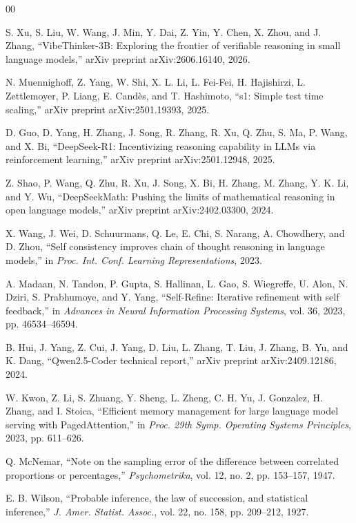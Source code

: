 \documentclass[conference]{IEEEtran}
\begin{document}
\begin{thebibliography}{00}

S. Xu, S. Liu, W. Wang, J. Min, Y. Dai, Z. Yin, Y. Chen, X. Zhou, and J. Zhang,
``VibeThinker-3B: Exploring the frontier of verifiable reasoning in small language
models,'' arXiv preprint arXiv:2606.16140, 2026.

N. Muennighoff, Z. Yang, W. Shi, X. L. Li, L. Fei-Fei, H. Hajishirzi,
L. Zettlemoyer, P. Liang, E. Cand\`{e}s, and T. Hashimoto, ``s1: Simple test time
scaling,'' arXiv preprint arXiv:2501.19393, 2025.

D. Guo, D. Yang, H. Zhang, J. Song, R. Zhang, R. Xu, Q. Zhu, S. Ma, P. Wang, and
X. Bi, ``DeepSeek-R1: Incentivizing reasoning capability in LLMs via reinforcement
learning,'' arXiv preprint arXiv:2501.12948, 2025.

Z. Shao, P. Wang, Q. Zhu, R. Xu, J. Song, X. Bi, H. Zhang, M. Zhang, Y. K. Li, and
Y. Wu, ``DeepSeekMath: Pushing the limits of mathematical reasoning in open
language models,'' arXiv preprint arXiv:2402.03300, 2024.

X. Wang, J. Wei, D. Schuurmans, Q. Le, E. Chi, S. Narang, A. Chowdhery, and
D. Zhou, ``Self consistency improves chain of thought reasoning in language
models,'' in \emph{Proc. Int. Conf. Learning Representations}, 2023.

A. Madaan, N. Tandon, P. Gupta, S. Hallinan, L. Gao, S. Wiegreffe, U. Alon,
N. Dziri, S. Prabhumoye, and Y. Yang, ``Self-Refine: Iterative refinement with self
feedback,'' in \emph{Advances in Neural Information Processing Systems}, vol. 36,
2023, pp. 46534--46594.

B. Hui, J. Yang, Z. Cui, J. Yang, D. Liu, L. Zhang, T. Liu, J. Zhang, B. Yu, and
K. Dang, ``Qwen2.5-Coder technical report,'' arXiv preprint arXiv:2409.12186, 2024.

W. Kwon, Z. Li, S. Zhuang, Y. Sheng, L. Zheng, C. H. Yu, J. Gonzalez, H. Zhang, and
I. Stoica, ``Efficient memory management for large language model serving with
PagedAttention,'' in \emph{Proc. 29th Symp. Operating Systems Principles}, 2023,
pp. 611--626.

Q. McNemar, ``Note on the sampling error of the difference between correlated
proportions or percentages,'' \emph{Psychometrika}, vol. 12, no. 2, pp. 153--157,
1947.

E. B. Wilson, ``Probable inference, the law of succession, and statistical
inference,'' \emph{J. Amer. Statist. Assoc.}, vol. 22, no. 158, pp. 209--212, 1927.

\end{thebibliography}
\end{document}
